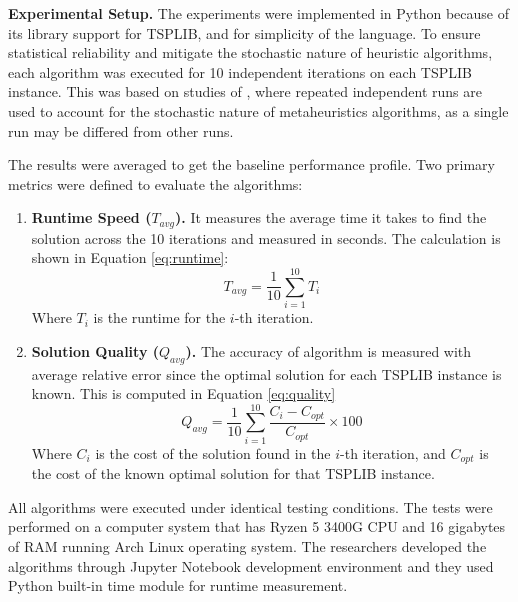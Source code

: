 \textbf{Experimental Setup.} The experiments were implemented in Python because of its library support for TSPLIB, and for simplicity of the language. To ensure statistical reliability and mitigate the stochastic nature of heuristic algorithms, each algorithm was executed for 10 independent iterations on each TSPLIB instance. This was based on studies of \textcite{Hossain2024,Wadi2025}, where repeated independent runs are used to account for the stochastic nature of metaheuristics algorithms, as a single run may be differed from other runs.

The results were averaged to get the baseline performance profile. 
Two primary metrics were defined to evaluate the algorithms:

\begin{enumerate}
	\item \textbf{Runtime Speed (\( T_{avg} \)).} It measures the average time it takes to find the solution across the 10 iterations and measured in seconds.  The calculation is shown in Equation \ref{eq:runtime}: 
	\begin{equation}
		\label{eq:runtime}
		T_{avg} = \frac{1}{10} \sum_{i=1}^{10} T_i
	\end{equation}
	Where $T _{i}$ is the runtime for the $i$-th iteration.

\item \textbf{Solution Quality (\( Q_{avg} \)).} The accuracy of algorithm is measured with average relative error since the optimal solution for each TSPLIB instance is known. This is computed in Equation \ref{eq:quality}
	\begin{equation}
		\label{eq:quality}
		Q_{avg} = \frac{1}{10} \sum_{i=1}^{10} \frac{C_i - C_{opt}}{C_{opt}} \times 100
	\end{equation}
	Where $C_i$ is the cost of the solution found in the $i$-th iteration, and $C_{opt}$ is the cost of the known optimal solution for that TSPLIB instance.
\end{enumerate}

All algorithms were executed under identical testing conditions. The tests were performed on a computer system that has Ryzen 5 3400G CPU and 16 gigabytes of RAM running Arch Linux operating system. The researchers developed the algorithms through Jupyter Notebook development environment and they used Python built-in time module for runtime measurement.

